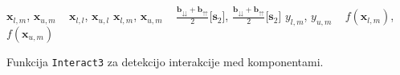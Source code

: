 \begin{algorithm}
    \DontPrintSemicolon

    $\mathbf{x}_{l,m}$, $\mathbf{x}_{u,m}$ \gets~ $\mathbf{x}_{l,l}$, $\mathbf{x}_{u,l}$\;
    $\mathbf{x}_{l,m}$, $\mathbf{x}_{u,m}$ \gets~ $\frac{\mathbf{b}_{\downdownarrows} + \mathbf{b}_{\upuparrows}}{2}$[$\mathbf{s}_2$], $\frac{\mathbf{b}_{\downdownarrows} + \mathbf{b}_{\upuparrows}}{2}$[$\mathbf{s}_2$]\;
    $y_{l,m}$, $y_{u,m}$ \gets~ $f(\mathbf{x}_{l,m})$, $f(\mathbf{x}_{u,m})$\;

	\caption{Funkcija \texttt{Interact3} za detekcijo interakcije med komponentami.}
	\label{pcode:trdg:interact}
\end{algorithm}

